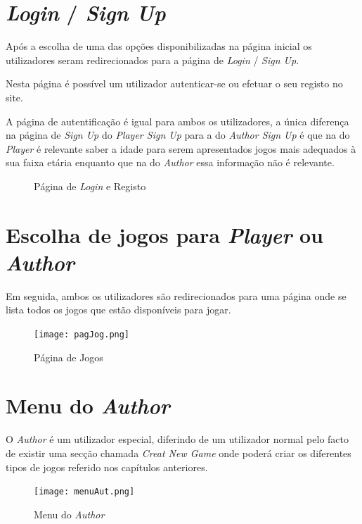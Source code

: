 \documentclass[11pt,a4paper]{report}
\begin{document}
\section{\emph{Login} / \emph{Sign Up}}
Após a escolha de uma das opções disponibilizadas na página inicial os utilizadores seram redirecionados para a página de \emph{Login} / \emph{Sign Up}. 

Nesta página é possível um utilizador autenticar-se ou efetuar o seu registo no site. 

A página de autentificação é igual para ambos os utilizadores, a única diferença na página de \emph{Sign Up} do \emph{Player Sign Up} para a do \emph{Author Sign Up} é que na do \emph{Player} é relevante saber a idade para serem apresentados jogos mais adequados à sua faixa etária enquanto que na do \emph{Author} essa informação não é relevante. 

\begin{figure}[h]%
    \centering
    \qquad
    \qquad
    \caption{Página de \emph{Login} e Registo}%
    \label{fig:log&sigUp}%
\end{figure}

\newpage

\section{Escolha de jogos para \emph{Player} ou \emph{Author}}
Em seguida, ambos os utilizadores são redirecionados para uma página onde se lista todos os jogos que estão disponíveis para jogar.

\begin{figure}[h]
    \centering
    \texttt{[image: pagJog.png]}
    \caption{Página de Jogos}
    \label{fig:pagJog}
\end{figure}

\section{Menu do \emph{Author}}
O \emph{Author} é um utilizador especial, diferindo de um utilizador normal pelo facto de existir uma secção chamada \emph{Creat New Game} onde poderá criar os diferentes tipos de jogos referido nos capítulos anteriores.

\begin{figure}[h]
    \centering
    \texttt{[image: menuAut.png]}
    \caption{Menu do \emph{Author}}
    \label{fig:menuAut}
\end{figure}
\end{document}
